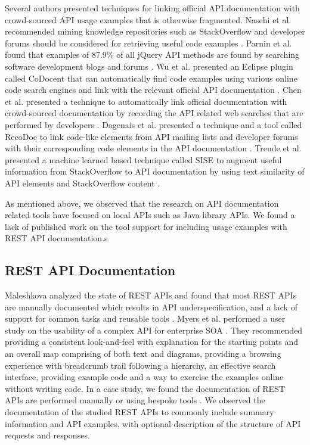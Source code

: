 \documentclass[10pt, conference]{IEEEtran}
\begin{document}
Several authors presented techniques for linking official API documentation with crowd-sourced API usage examples that is otherwise fragmented. Nasehi et al. recommended mining knowledge repositories such as StackOverflow and developer forums should be considered for retrieving useful code examples \cite{Nasehi_what_makes}. Parnin et al. found that examples of 87.9\% of all jQuery API methods are found by searching software development blogs and forums \cite{Parnin_measuring}. Wu et al. presented an Eclipse plugin called CoDocent that can automatically find code examples using various online code search engines and link with the relevant official API documentation \cite{wu2010codocent}. Chen et al. presented a technique to automatically link official documentation with crowd-sourced documentation by recording the API related web searches that are performed by developers \cite{Chen_who_asked}. Dagenais et al. presented a technique and a tool called RecoDoc to link code-like elements from API mailing lists and developer forums with their corresponding code elements in the API documentation \cite{dagenais2012recovering}. Treude et al. presented a machine learned based technique called SISE to augment useful information from StackOverflow to API documentation by using text similarity of API elements and StackOverflow content \cite{Treude:2016:AAD:2884781.2884800}.

As mentioned above, we observed that the research on API documentation related tools have focused on local APIs such as Java library APIs. We found a lack of published work on the tool support for including usage examples with REST API documentation.s

\subsection{REST API Documentation} %
Maleshkova analyzed the state of REST APIs and found that most REST APIs are manually documented which results in API underspecification, and a lack of support for common tasks and reusable tools \cite{Maleshkova_investigating}. Myers et al. performed a user study on the usability of a complex API for enterprise SOA \cite{Myers_study}. They recommended providing a consistent look-and-feel with explanation for the starting points and an overall map comprising of both text and diagrams, providing a browsing experience with breadcrumb trail following a hierarchy, an effective search interface, providing example code and a way to exercise the examples online without writing code. In a case study, we found the documentation of REST APIs are performed manually or using bespoke tools \cite{sohan2015case}. We observed the documentation of the studied REST APIs to commonly include summary information and API examples, with optional description of the structure of API requests and responses.
\end{document}
